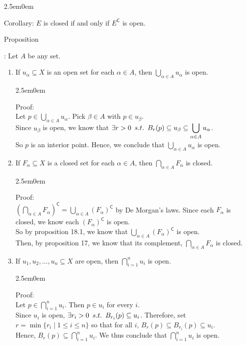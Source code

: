 \documentclass{book}
\newcommand{\hThree}{%
   \color{PineGreen}
   \fontsize{13}{15}\selectfont%
}
\newenvironment{myIndent}{%
   \begin{adjustwidth}{2.5em}{0em}%
}{%
   \end{adjustwidth}%
}
\newcommand{\retTwo}{\hfill\bigbreak}
\newcommand{\suchthat}{ \hspace{0.5em}s.t.\hspace{0.5em}}
\newcommand{\comp}{\mathsf{C}}
\newcounter{PropNumber}
\newcommand{\propCount}[1][1]{%
   \addtocounter{PropNumber}{#1}%
   \thePropNumber%
}
\begin{document}
{\begin{myIndent}
      Corollary: $E$ is closed if and only if $E^\comp$ is open. \retTwo

      Proposition \propCount: Let $A$ be any set.
      \begin{enumerate}
         \item If $u_\alpha \subseteq X$ is an open set for each $\alpha \in A$, then ${\displaystyle \bigcup_{\alpha \in A}{u_\alpha}}$ is open.
         
         {\begin{myIndent} \hThree
            Proof:\\ Let $p \in {\displaystyle \bigcup_{\alpha \in A}{u_\alpha}}$. Pick $\beta \in A$ with $p \in u_\beta$.\\
            Since $u_\beta$ is open, we know that $\exists r>0 \suchthat B_r(p) \subseteq u_\beta \subseteq {\displaystyle \bigcup_{\alpha \in A}{u_\alpha}}$.\\ So $p$ is an interior point. Hence, we conclude that ${\displaystyle \bigcup_{\alpha \in A}{u_\alpha}}$ is open. \retTwo
         \end{myIndent}}

         \item If $F_\alpha \subseteq X$ is a closed set for each $\alpha \in A$, then  ${\displaystyle \bigcap_{\alpha \in A}{F_\alpha}}$ is closed.
         
         {\begin{myIndent} \hThree
            Proof:\\ $\left({\displaystyle \bigcap_{\alpha \in A}{F_\alpha}}\right)^\comp = {\displaystyle \bigcup_{\alpha \in A}{\left(F_\alpha\right)^\comp}}$ by De Morgan's laws.
            \newpage
            Since each $F_\alpha$ is closed, we know each $\left(F_\alpha\right)^\comp$ is open.\\ So by proposition 18.1, we know that ${\displaystyle \bigcup_{\alpha \in A}{\left(F_\alpha\right)^\comp}}$ is open.\\ Then, by proposition 17, we know that its complement, ${\displaystyle \bigcap_{\alpha \in A}{F_\alpha}}$ is closed. \retTwo
         \end{myIndent}}

         \item If $u_1, u_2, \ldots, u_n \subseteq X$ are open, then ${\displaystyle \bigcap_{i = 1}^n{u_i}}$ is open.
         

         {\begin{myIndent} \hThree
            Proof:\\
            Let $p \in {\displaystyle \bigcap_{i = 1}^n{u_i}}$. Then $p \in u_i$ for every $i$.\\
            Since $u_i$ is open, $\exists r_i > 0 \suchthat B_{r_i}(p) \subseteq u_i$. Therefore, set\\ $r = \min{\{r_i \mid 1\leq i \leq n\}}$ so that for all $i$, $B_r(p) \subseteq B_{r_i}(p) \subseteq u_i$.\\
            Hence, $B_r(p) \subseteq {\displaystyle \bigcap_{i = 1}^n{u_i}}$. We thus conclude that ${\displaystyle \bigcap_{i = 1}^n{u_i}}$ is open. \retTwo
         \end{myIndent}}


\end{enumerate}
\end{myIndent}}
\end{document}
